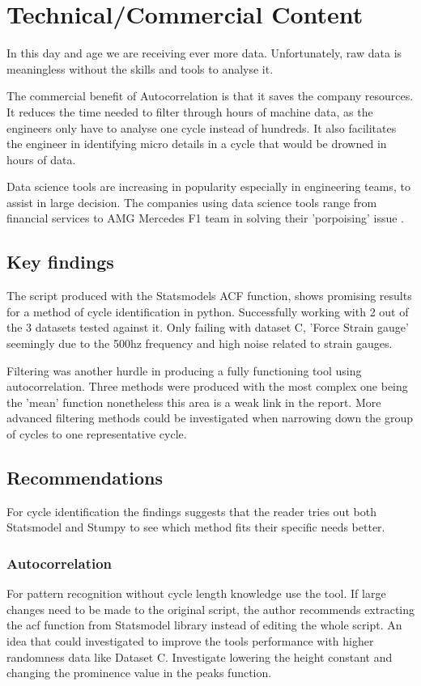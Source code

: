 \section{Technical/Commercial Content}

In this day and age we are receiving ever more data. Unfortunately, raw data is meaningless without the skills and tools to analyse it.

The commercial benefit of Autocorrelation is that it saves the company resources. It reduces the time needed to filter through hours of machine data, as the engineers only have to analyse one cycle instead of hundreds. It also facilitates the engineer in identifying micro details in a cycle that would be drowned in hours of data. 

Data science tools are increasing in popularity especially in engineering teams, to assist in large decision. The companies using data science tools range from financial services to AMG Mercedes F1 team in solving their 'porpoising' issue \cite{mercedes}. 

\subsection{Key findings}
The script produced with the Statsmodels ACF function, shows promising results for a method of cycle identification in python. Successfully working with 2 out of the 3 datasets tested against it. Only failing with dataset C, 'Force Strain gauge' seemingly due to the 500hz frequency and high noise related to strain gauges.

Filtering was another hurdle in producing a fully functioning tool using autocorrelation. Three methods were produced with the most complex one being the 'mean' function nonetheless this area is a weak link in the report. More advanced filtering methods could be investigated when narrowing down the group of cycles to one representative cycle. 

\subsection{Recommendations}
For cycle identification the findings suggests that the reader tries out both Statsmodel and Stumpy to see which method fits their specific needs better. 
\subsubsection{Autocorrelation}
For pattern recognition without cycle length knowledge use the tool. If large changes need to be made to the original script, the author recommends extracting the acf function from Statsmodel library instead of editing the whole script. 
An idea that could investigated to improve the tools performance with higher randomness data like Dataset C. Investigate lowering the height constant and changing the prominence value in the peaks function. 

